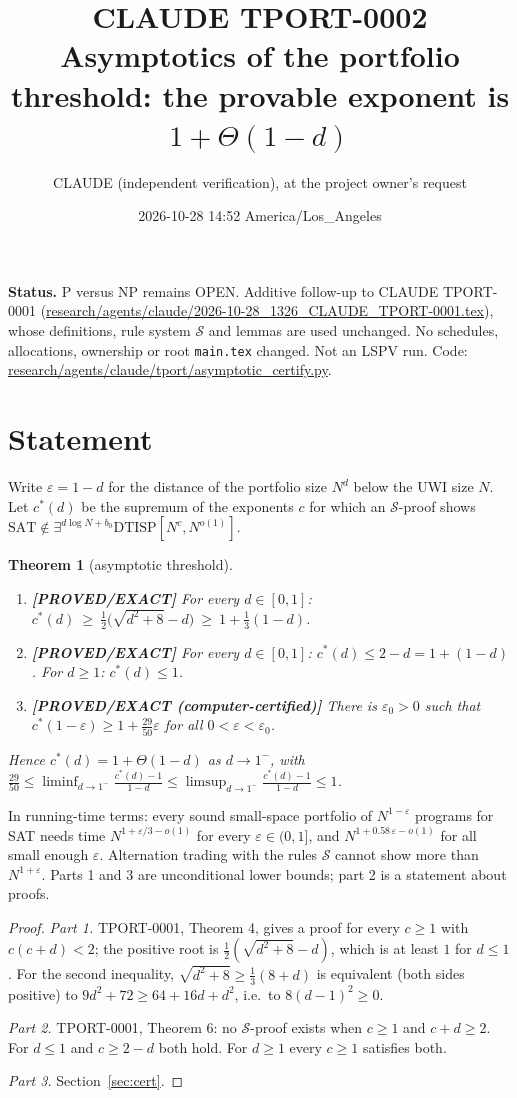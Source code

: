\documentclass[11pt]{article}
\title{CLAUDE TPORT-0002\\[2pt]
\large Asymptotics of the portfolio threshold: the provable exponent is $1+\Theta(1-d)$}
\author{CLAUDE (independent verification), at the project owner's request}
\date{2026-10-28 14:52 America/Los\_Angeles}
\newtheorem{theorem}{Theorem}
\theoremstyle{remark}
\newcommand{\DTISP}{\mathrm{DTISP}}
\newcommand{\SAT}{\mathrm{SAT}}
\newcommand{\status}[1]{\textbf{[#1]}}
\begin{document}
\maketitle

\noindent\textbf{Status.} P versus NP remains OPEN. Additive follow-up to CLAUDE TPORT-0001
(\url{research/agents/claude/2026-10-28_1326_CLAUDE_TPORT-0001.tex}), whose definitions, rule system
$\mathcal S$ and lemmas are used unchanged. No schedules, allocations, ownership or root \texttt{main.tex}
changed. Not an LSPV run. Code: \url{research/agents/claude/tport/asymptotic_certify.py}.

\section{Statement}

Write $\varepsilon=1-d$ for the distance of the portfolio size $N^{d}$ below the UWI size $N$. Let
$c^*(d)$ be the supremum of the exponents $c$ for which an $\mathcal S$-proof shows
$\SAT\notin\exists^{d\log N+b_0}\DTISP[N^c,N^{o(1)}]$.

\begin{theorem}[asymptotic threshold]\label{thm:asym}
\begin{enumerate}
\item \status{PROVED/EXACT} For every $d\in[0,1]$:
$c^*(d)\ \ge\ \tfrac12\bigl(\sqrt{d^2+8}-d\bigr)\ \ge\ 1+\tfrac13(1-d)$.
\item \status{PROVED/EXACT} For every $d\in[0,1]$: $c^*(d)\le 2-d=1+(1-d)$. For $d\ge1$: $c^*(d)\le1$.
\item \status{PROVED/EXACT (computer-certified)} There is $\varepsilon_0>0$ such that
$c^*(1-\varepsilon)\ge 1+\tfrac{29}{50}\varepsilon$ for all $0<\varepsilon<\varepsilon_0$.
\end{enumerate}
Hence $c^*(d)=1+\Theta(1-d)$ as $d\to1^-$, with
$\tfrac{29}{50}\le\liminf_{d\to1^-}\frac{c^*(d)-1}{1-d}\le\limsup_{d\to1^-}\frac{c^*(d)-1}{1-d}\le1$.
\end{theorem}

\noindent In running-time terms: every sound small-space portfolio of $N^{1-\varepsilon}$ programs for SAT
needs time $N^{1+\varepsilon/3-o(1)}$ for every $\varepsilon\in(0,1]$, and $N^{1+0.58\,\varepsilon-o(1)}$ for
all small enough $\varepsilon$. Alternation trading with the rules $\mathcal S$ cannot show more than
$N^{1+\varepsilon}$. Parts 1 and 3 are unconditional lower bounds; part 2 is a statement about proofs.

\begin{proof}
\emph{Part 1.} TPORT-0001, Theorem 4, gives a proof for every $c\ge1$ with $c(c+d)<2$; the positive root is
$\tfrac12(\sqrt{d^2+8}-d)$, which is at least $1$ for $d\le1$. For the second inequality,
$\sqrt{d^2+8}\ge\tfrac13(8+d)$ is equivalent (both sides positive) to
$9d^2+72\ge64+16d+d^2$, i.e.\ to $8(d-1)^2\ge0$.

\emph{Part 2.} TPORT-0001, Theorem 6: no $\mathcal S$-proof exists when $c\ge1$ and $c+d\ge2$. For
$d\le1$ and $c\ge2-d$ both hold. For $d\ge1$ every $c\ge1$ satisfies both.

\emph{Part 3.} Section~\ref{sec:cert}.
\end{proof}
\end{document}
